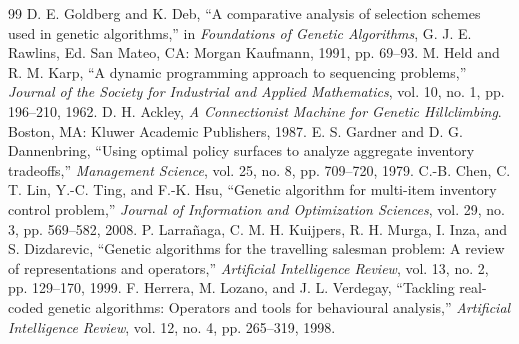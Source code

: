 \documentclass[conference]{IEEEtran}
\begin{document}
\begin{thebibliography}{99}
 D. E. Goldberg and K. Deb, ``A comparative analysis of selection schemes used in genetic algorithms,'' in \emph{Foundations of Genetic Algorithms}, G. J. E. Rawlins, Ed. San Mateo, CA: Morgan Kaufmann, 1991, pp. 69--93.
 M. Held and R. M. Karp, ``A dynamic programming approach to sequencing problems,'' \emph{Journal of the Society for Industrial and Applied Mathematics}, vol. 10, no. 1, pp. 196--210, 1962.
 D. H. Ackley, \emph{A Connectionist Machine for Genetic Hillclimbing}. Boston, MA: Kluwer Academic Publishers, 1987.
 E. S. Gardner and D. G. Dannenbring, ``Using optimal policy surfaces to analyze aggregate inventory tradeoffs,'' \emph{Management Science}, vol. 25, no. 8, pp. 709--720, 1979.
 C.-B. Chen, C. T. Lin, Y.-C. Ting, and F.-K. Hsu, ``Genetic algorithm for multi-item inventory control problem,'' \emph{Journal of Information and Optimization Sciences}, vol. 29, no. 3, pp. 569--582, 2008.
 P. Larra\~naga, C. M. H. Kuijpers, R. H. Murga, I. Inza, and S. Dizdarevic, ``Genetic algorithms for the travelling salesman problem: A review of representations and operators,'' \emph{Artificial Intelligence Review}, vol. 13, no. 2, pp. 129--170, 1999.
 F. Herrera, M. Lozano, and J. L. Verdegay, ``Tackling real-coded genetic algorithms: Operators and tools for behavioural analysis,'' \emph{Artificial Intelligence Review}, vol. 12, no. 4, pp. 265--319, 1998.
\end{thebibliography}
\end{document}
